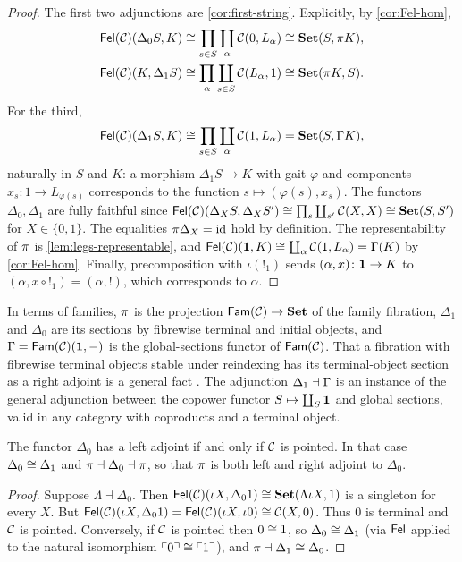 \begin{proof}
The first two adjunctions are \cref{cor:first-string}. Explicitly, by
\cref{cor:Fel-hom},
\begin{align*}
\mathsf{Fel}(\mathcal{C})(\Delta_0S,K)&\cong\prod_{s\in S}\coprod_\alpha\mathcal{C}(0,L_\alpha)\cong\mathbf{Set}(S,\pi K),\\
\mathsf{Fel}(\mathcal{C})(K,\Delta_1S)&\cong\prod_\alpha\coprod_{s\in S}\mathcal{C}(L_\alpha,1)\cong\mathbf{Set}(\pi K,S).
\end{align*}
For the third,
\[
\mathsf{Fel}(\mathcal{C})(\Delta_1S,K)\cong\prod_{s\in S}\coprod_{\alpha}\mathcal{C}(1,L_\alpha)=\mathbf{Set}(S,\Gamma K),
\]
naturally in $S$ and $K$: a morphism $\Delta_1 S\to K$ with gait $\varphi$ and
components $x_s\colon 1\to L_{\varphi(s)}$ corresponds to the function
$s\mapsto(\varphi(s),x_s)$. The functors $\Delta_0,\Delta_1$ are fully faithful
since $\mathsf{Fel}(\mathcal{C})(\Delta_XS,\Delta_XS')\cong\prod_{s}\coprod_{s'}\mathcal{C}(X,X)\cong\mathbf{Set}(S,S')$
for $X\in\{0,1\}$. The equalities $\pi\Delta_X=\mathrm{id}$ hold by definition. The
representability of $\pi$ is \cref{lem:legs-representable}, and
$\mathsf{Fel}(\mathcal{C})(\mathbf{1},K)\cong\coprod_\alpha\mathcal{C}(1,L_\alpha)=\Gamma(K)$ by
\cref{cor:Fel-hom}. Finally, precomposition with $\iota({!_1})$ sends
$(\alpha,x)\colon\mathbf{1}\to K$ to $(\alpha,x\circ{!_1})=(\alpha,!)$, which
corresponds to $\alpha$.
\end{proof}

\begin{remark}\label{rem:string-honest}
In terms of families, $\pi$ is the projection $\mathsf{Fam}(\mathcal{C})\to\mathbf{Set}$ of the
family fibration, $\Delta_1$ and $\Delta_0$ are its sections by fibrewise
terminal and initial objects, and $\Gamma=\mathsf{Fam}(\mathcal{C})(\mathbf{1},-)$ is the
global-sections functor of $\mathsf{Fam}(\mathcal{C})$. That a fibration with fibrewise
terminal objects stable under reindexing has its terminal-object section as a
right adjoint is a general fact \cite{Jacobs1999}. The adjunction
$\Delta_1\dashv\Gamma$ is an instance of the general adjunction between the
copower functor $S\mapsto\coprod_S\mathbf{1}$ and global sections, valid in any
category with coproducts and a terminal object.
\end{remark}

\begin{proposition}\label{prop:Delta0-left}
The functor $\Delta_0$ has a left adjoint if and only if $\mathcal{C}$ is pointed. In
that case $\Delta_0\cong\Delta_1$ and $\pi\dashv\Delta_0\dashv\pi$, so that
$\pi$ is both left and right adjoint to $\Delta_0$.
\end{proposition}

\begin{proof}
Suppose $\Lambda\dashv\Delta_0$. Then
$\mathsf{Fel}(\mathcal{C})(\iota X,\Delta_0 1)\cong\mathbf{Set}(\Lambda\iota X,1)$ is a singleton for every
$X$. But $\mathsf{Fel}(\mathcal{C})(\iota X,\Delta_01)=\mathsf{Fel}(\mathcal{C})(\iota X,\iota 0)\cong\mathcal{C}(X,0)$.
Thus $0$ is terminal and $\mathcal{C}$ is pointed. Conversely, if $\mathcal{C}$ is pointed then
$0\cong1$, so $\Delta_0\cong\Delta_1$ (via $\mathsf{Fel}$ applied to the natural
isomorphism $\ulcorner0\urcorner\cong\ulcorner1\urcorner$), and
$\pi\dashv\Delta_1\cong\Delta_0$.
\end{proof}

